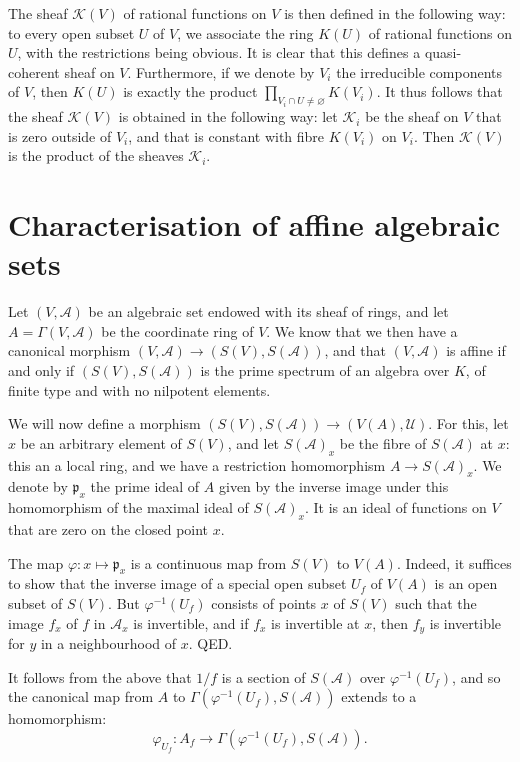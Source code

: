 \documentclass{article}
\newcommand{\scr}[1]{{\mathscr{#1}}}
\newcommand{\oldpage}[1]{\marginpar{\footnotesize$\Big\vert$ \textit{p.~#1}}}
\begin{document}
The sheaf $\scr{K}(V)$ of rational functions on $V$ is then defined in the following way:
to every open subset $U$ of $V$, we associate the ring $K(U)$ of
\oldpage{2-04}
rational functions on $U$, with the restrictions being obvious.
It is clear that this defines a quasi-coherent sheaf on $V$.
Furthermore, if we denote by $V_i$ the irreducible components of $V$, then $K(U)$ is exactly the product $\prod_{V_i\cap U\neq\varnothing}K(V_i)$.
It thus follows that the sheaf $\scr{K}(V)$ is obtained in the following way:
let $\scr{K}_i$ be the sheaf on $V$ that is zero outside of $V_i$, and that is constant with fibre $K(V_i)$ on $V_i$.
Then $\scr{K}(V)$ is the product of the sheaves $\scr{K}_i$.


\section{Characterisation of affine algebraic sets}
\label{section4}

Let $(V,\scr{A})$ be an algebraic set endowed with its sheaf of rings, and let $A=\Gamma(V,\scr{A})$ be the coordinate ring of $V$.
We know that we then have a canonical morphism $(V,\scr{A})\to(S(V),S(\scr{A}))$, and that $(V,\scr{A})$ is affine if and only if $(S(V),S(\scr{A}))$ is the prime spectrum of an algebra over $K$, of finite type and with no nilpotent elements.

We will now define a morphism $(S(V),S(\scr{A}))\to(V(A),\scr{U})$.
For this, let $x$ be an arbitrary element of $S(V)$, and let $S(\scr{A})_x$ be the fibre of $S(\scr{A})$ at $x$: this an a local ring, and we have a restriction homomorphism $A\to S(\scr{A})_x$.
We denote by $\mathfrak{p}_x$ the prime ideal of $A$ given by the inverse image under this homomorphism of the maximal ideal of $S(\scr{A})_x$.
It is an ideal of functions on $V$ that are zero on the closed point $x$.

The map $\varphi\colon x\mapsto\mathfrak{p}_x$ is a continuous map from $S(V)$ to $V(A)$.
Indeed, it suffices to show that the inverse image of a special open subset $U_f$ of $V(A)$ is an open subset of $S(V)$.
But $\varphi^{-1}(U_f)$ consists of points $x$ of $S(V)$ such that the image $f_x$ of $f$ in $\scr{A}_x$ is invertible, and if $f_x$ is invertible at $x$, then $f_y$ is invertible for $y$ in a neighbourhood of $x$.
QED.

It follows from the above that $1/f$ is a section of $S(\scr{A})$ over $\varphi^{-1}(U_f)$, and so the canonical map from $A$ to $\Gamma(\varphi^{-1}(U_f),S(\scr{A}))$ extends to a homomorphism:
\[
  \varphi_{U_f}\colon A_f \to \Gamma(\varphi^{-1}(U_f), S(\scr{A})).
\]
\end{document}
